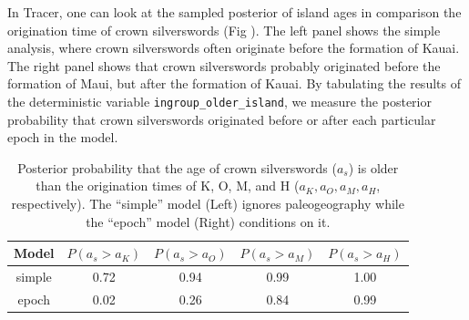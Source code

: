 In Tracer, one can look at the sampled posterior of island ages in comparison the origination time of crown silverswords (Fig \label{fig:epoch_ages}).
The left panel shows the simple analysis, where crown silverswords often originate before the formation of Kauai.
The right panel shows that crown silverswords probably originated before the formation of Maui, but after the formation of Kauai.
By tabulating the results of the deterministic variable {\tt ingroup\_older\_island}, we measure the posterior probability that crown silverswords originated before or after each particular epoch in the model.

\begin{table}[!ht]
\centering
\begin{tabular}{c|cccc}
Model       & $P(a_s>a_K)$ & $P(a_s>a_O)$ & $P(a_s>a_M)$ & $P(a_s>a_H)$ \\ \hline
simple & 0.72 & 0.94 & 0.99 & 1.00 \\
epoch & 0.02 & 0.26 & 0.84 & 0.99 \\
\end{tabular}
\caption{Posterior probability that the age of crown silverswords ($a_s$) is older than the origination times of K, O, M, and H ($a_K, a_O, a_M, a_H$, respectively). The ``simple'' model (Left) ignores paleogeography while the ``epoch'' model (Right) conditions on it.}
\end{table}


\newpage
